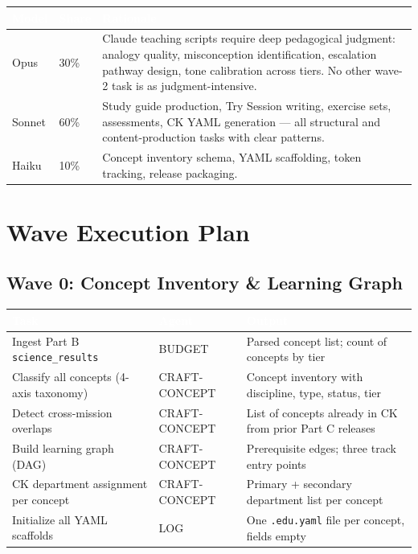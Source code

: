 \documentclass[11pt,letterpaper]{article}
\newcommand{\tableheader}[1]{\textbf{\sffamily\textcolor{white}{#1}}}
\begin{document}
\begin{center}
\begin{tabularx}{\textwidth}{L{2cm}C{1.5cm}X}
\toprule
{}
\tableheader{Model} & \tableheader{Share} & \tableheader{Rationale} \\
\midrule
Opus & 30\% & Claude teaching scripts require deep pedagogical judgment: analogy quality, misconception identification, escalation pathway design, tone calibration across tiers. No other wave-2 task is as judgment-intensive. \\
Sonnet & 60\% & Study guide production, Try Session writing, exercise sets, assessments, CK YAML generation --- all structural and content-production tasks with clear patterns. \\
Haiku & 10\% & Concept inventory schema, YAML scaffolding, token tracking, release packaging. \\
\bottomrule
\end{tabularx}
\end{center}

\section{Wave Execution Plan}

\subsection{Wave 0: Concept Inventory \& Learning Graph}

\begin{center}
\begin{tabularx}{\textwidth}{L{4cm}C{2cm}X}
\toprule
{}
\tableheader{Task} & \tableheader{Agent} & \tableheader{Output} \\
\midrule
Ingest Part B \texttt{science\_results} & BUDGET & Parsed concept list; count of concepts by tier \\
Classify all concepts (4-axis taxonomy) & CRAFT-CONCEPT & Concept inventory with discipline, type, status, tier \\
Detect cross-mission overlaps & CRAFT-CONCEPT & List of concepts already in CK from prior Part C releases \\
Build learning graph (DAG) & CRAFT-CONCEPT & Prerequisite edges; three track entry points \\
CK department assignment per concept & CRAFT-CONCEPT & Primary + secondary department list per concept \\
Initialize all YAML scaffolds & LOG & One \texttt{.edu.yaml} file per concept, fields empty \\
\bottomrule
\end{tabularx}
\end{center}
\end{document}
